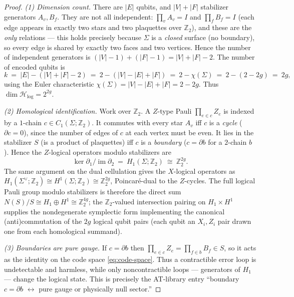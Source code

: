 \documentclass[12pt]{article}
\theoremstyle{definition}
\theoremstyle{remark}
\newcommand{\Ho}{\mathcal{H}}
\newcommand{\Hlog}{\Ho_{\mathrm{log}}}
\newcommand{\ZZ}{\mathbb{Z}}
\DeclareMathOperator{\im}{im}
\begin{document}
\begin{proof}
\emph{(1) Dimension count.} There are $|E|$ qubits, and $|V|+|F|$ stabilizer generators
$A_v, B_f$. They are not all independent: $\prod_v A_v = I$ and $\prod_f B_f = I$ (each
edge appears in exactly two stars and two plaquettes over $\ZZ_2$), and these are the
\emph{only} relations --- this holds precisely because $\Sigma$ is a \emph{closed}
surface (no boundary), so every edge is shared by exactly two faces and two vertices.
Hence the number of independent generators is
$(|V|-1)+(|F|-1)=|V|+|F|-2$. The number of encoded qubits is
\[
k\ =\ |E|-(|V|+|F|-2)\ =\ 2-(|V|-|E|+|F|)\ =\ 2-\chi(\Sigma)\ =\ 2-(2-2g)\ =\ 2g,
\]
using the Euler characteristic $\chi(\Sigma)=|V|-|E|+|F|=2-2g$. Thus $\dim\Hlog=2^{2g}$.

\emph{(2) Homological identification.} Work over $\ZZ_2$. A $Z$-type Pauli
$\prod_{e\in c}Z_e$ is indexed by a $1$-chain $c\in C_1(\Sigma;\ZZ_2)$. It commutes with
every star $A_v$ iff $c$ is a \emph{cycle} ($\partial c=0$), since the number of edges of
$c$ at each vertex must be even. It lies in the stabilizer $S$ (is a product of
plaquettes) iff $c$ is a \emph{boundary} ($c=\partial b$ for a $2$-chain $b$). Hence
the $Z$-logical operators modulo stabilizers are
\[
\ker\partial_1/\im\partial_2\ =\ H_1(\Sigma;\ZZ_2)\ \cong\ \ZZ_2^{2g}.
\]
The same argument on the dual cellulation gives the $X$-logical operators as
$H_1(\Sigma^\vee;\ZZ_2)\cong H^1(\Sigma;\ZZ_2)\cong\ZZ_2^{2g}$, Poincar\'e-dual to the
$Z$-cycles. The full logical Pauli group modulo stabilizers is therefore the direct sum
$N(S)/S\cong H_1\oplus H^1\cong\ZZ_2^{4g}$; the $\ZZ_2$-valued intersection pairing on
$H_1\times H^1$ supplies the nondegenerate symplectic form implementing the canonical
(anti)commutation of the $2g$ logical qubit pairs (each qubit an $X_i,Z_i$ pair drawn one
from each homological summand).

\emph{(3) Boundaries are pure gauge.} If $c=\partial b$ then $\prod_{e\in c}Z_e=\prod_{f\in
b}B_f\in S$, so it acts as the identity on the code space \eqref{eq:code-space}. Thus a
contractible error loop is undetectable and harmless, while only noncontractible loops
--- generators of $H_1$ --- change the logical state. This is precisely the AT-library
entry ``boundary $c=\partial b$ $\leftrightarrow$ pure gauge or physically null
sector.''
\end{proof}

\begin{center}
\end{center}
\end{document}
